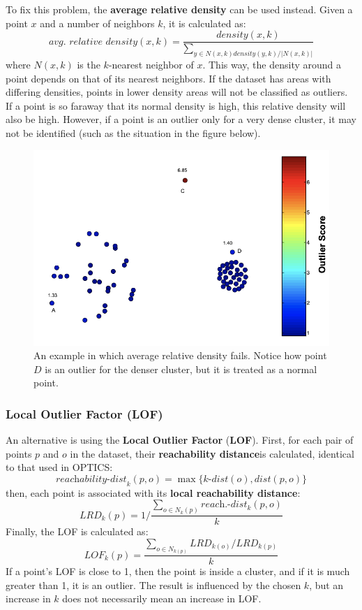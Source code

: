 To fix this problem, the \textbf{average relative density} can be used instead. Given a point $x$ and a number of neighbors $k$, it is calculated as:
\begin{equation*}
    \textit{avg. relative density}(x,k) = \dfrac{\textit{density}(x,k)}{\sum_{y \in N(x,k) \textit{density}(y,k)/|N(x,k)|}}
\end{equation*}
where $N(x,k)$ is the $k$-nearest neighbor of $x$. This way, the density around a point depends on that of its nearest neighbors. If the dataset has areas with differing densities, points in lower density areas will not be classified as outliers. If a point is so faraway that its normal density is high, this relative density will also be high. However, if a point is an outlier only for a very dense cluster, it may not be identified (such as the situation in the figure below).
\begin{figure}[h]
    \centering
    \includegraphics[width=0.5\linewidth]{img/relative_density.png}
    \caption{An example in which average relative density fails. Notice how point $D$ is an outlier for the denser cluster, but it is treated as a normal point.}
    \label{fig:relative-dist}
\end{figure}

\subsubsection{Local Outlier Factor (LOF)}

An alternative is using the \textbf{Local Outlier Factor} (\textbf{LOF}). First, for each pair of points $p$ and $o$ in the dataset, their \textbf{reachability distance}is calculated, identical to that used in OPTICS:
\begin{equation*}
    \textit{reachability-dist}_k(p,o) = \max \{\textit{k-dist}(o), \textit{dist}(p,o)\}
\end{equation*}
then, each point is associated with its \textbf{local reachability distance}:
\begin{equation*}
    \textit{LRD}_k(p) = 1 / \dfrac{\sum_{o \in \textit{N}_k(p)} \textit{reach.-dist}_k(p,o)}{k}
\end{equation*}
Finally, the LOF is calculated as:
\begin{equation*}
    \textit{LOF}_{\textit{k}}(p) = \dfrac{\sum_{o \in N_{k(p)}} \textit{LRD}_{k(o)} / \textit{LRD}_{k(p)} }{k}
\end{equation*}
If a point's LOF is close to 1, then the point is inside a cluster, and if it is much greater than 1, it is an outlier. The result is influenced by the chosen $k$, but an increase in $k$ does not necessarily mean an increase in LOF.

